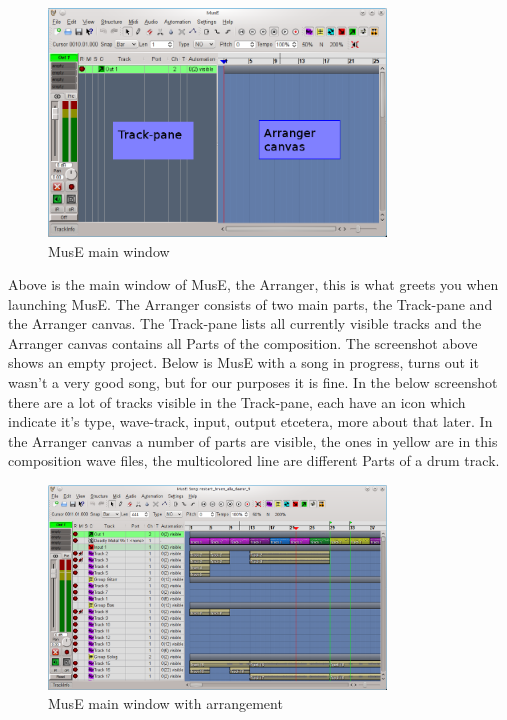 \documentclass[a4paper]{report}
\newcommand{\screenshotwidth}[0]{0.8\textwidth}
\begin{document}
\label{Main/Arranger} 
\begin{figure}[htp]
\centering \includegraphics[width=\screenshotwidth]
{pics/main_window_annotated} 
\caption{MusE main window}
\label{fig:Main Window} 
\end{figure}
Above is the main window of MusE, the Arranger, this is what greets you
when launching MusE. The Arranger consists of two main parts, the Track-pane
and the Arranger canvas. The Track-pane lists all currently visible tracks
and the Arranger canvas contains all Parts of the composition. The
screenshot above shows an empty project. Below is MusE with a song in
progress, turns out it wasn't a very good song, but for our purposes it
is fine. In the below screenshot there are a lot of tracks visible in the
Track-pane, each have an icon which indicate it's type, wave-track, input,
output etcetera, more about that later. In the Arranger canvas a number of
parts are visible, the ones in yellow are in this composition wave files,
the multicolored line are different Parts of a drum track.

\begin{figure}[htp]
\centering \includegraphics[width=\screenshotwidth]
{pics/main_window_with_arrangement} 
\caption{MusE main window with arrangement}
\label{fig:Main Window with arrangement} 
\end{figure}
\end{document}
